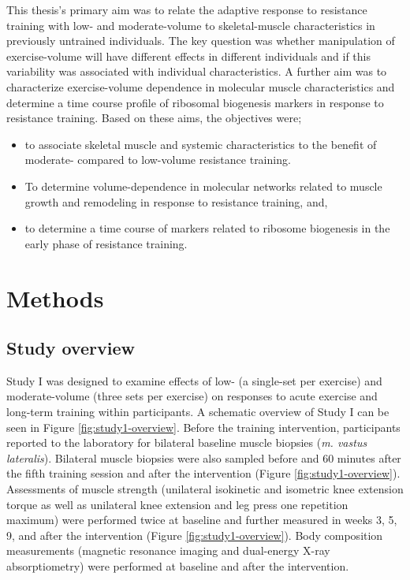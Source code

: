 \documentclass[twoside,10pt]{gihclass} %
\providecommand{\tightlist}{%
  \setlength{\itemsep}{0pt}\setlength{\parskip}{0pt}}
\begin{document}
This thesis's primary aim was to relate the adaptive response to resistance training with low- and moderate-volume to skeletal-muscle characteristics in previously untrained individuals. The key question was whether manipulation of exercise-volume will have different effects in different individuals and if this variability was associated with individual characteristics. A further aim was to characterize exercise-volume dependence in molecular muscle characteristics and determine a time course profile of ribosomal biogenesis markers in response to resistance training. Based on these aims, the objectives were;
\begin{itemize}
\tightlist
\item
  to associate skeletal muscle and systemic characteristics to the benefit of moderate- compared to low-volume resistance training.
\item
  To determine volume-dependence in molecular networks related to muscle growth and remodeling in response to resistance training, and,
\item
  to determine a time course of markers related to ribosome biogenesis in the early phase of resistance training.
\end{itemize}
\hypertarget{methods}{%
\chapter{Methods}\label{methods}}

\hypertarget{study-overview}{%
\section{Study overview}\label{study-overview}}

Study I was designed to examine effects of low- (a single-set per exercise) and moderate-volume (three sets per exercise) on responses to acute exercise and long-term training within participants.
A schematic overview of Study I can be seen in Figure \ref{fig:study1-overview}.
Before the training intervention, participants reported to the laboratory for bilateral baseline muscle biopsies (\emph{m. vastus lateralis}).
Bilateral muscle biopsies were also sampled before and 60 minutes after the fifth training session and after the intervention (Figure \ref{fig:study1-overview}).
Assessments of muscle strength (unilateral isokinetic and isometric knee extension torque as well as unilateral knee extension and leg press one repetition maximum) were performed twice at baseline and further measured in weeks 3, 5, 9, and after the intervention (Figure \ref{fig:study1-overview}).
Body composition measurements (magnetic resonance imaging and dual-energy X-ray absorptiometry) were performed at baseline and after the intervention.
\end{document}
